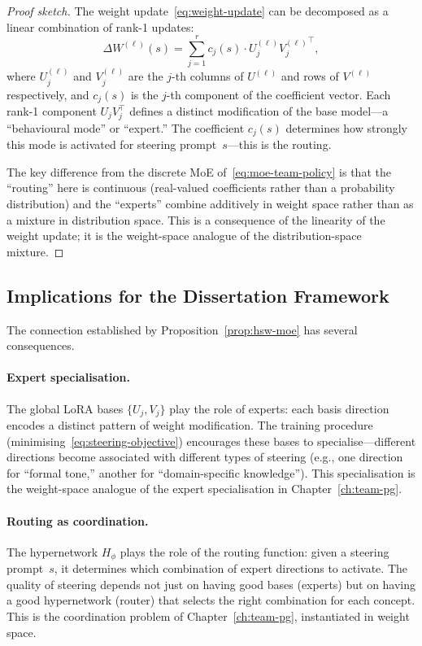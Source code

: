 \begin{proof}[Proof sketch]
The weight update~\eqref{eq:weight-update} can be decomposed as a linear combination of rank-1 updates:
\[
  \Delta W^{(\ell)}(s) = \sum_{j=1}^r c_j(s) \cdot U_j^{(\ell)} {V_j^{(\ell)}}^\top,
\]
where $U_j^{(\ell)}$ and $V_j^{(\ell)}$ are the $j$-th columns of $U^{(\ell)}$ and rows of $V^{(\ell)}$ respectively, and $c_j(s)$ is the $j$-th component of the coefficient vector. Each rank-1 component $U_j V_j^\top$ defines a distinct modification of the base model---a ``behavioural mode'' or ``expert.'' The coefficient $c_j(s)$ determines how strongly this mode is activated for steering prompt~$s$---this is the routing.

The key difference from the discrete MoE of~\eqref{eq:moe-team-policy} is that the ``routing'' here is continuous (real-valued coefficients rather than a probability distribution) and the ``experts'' combine additively in weight space rather than as a mixture in distribution space. This is a consequence of the linearity of the weight update; it is the weight-space analogue of the distribution-space mixture.
\end{proof}

\subsection{Implications for the Dissertation Framework}
\label{subsec:framework-implications}

The connection established by Proposition~\ref{prop:hsw-moe} has several consequences.

\paragraph{Expert specialisation.} The global LoRA bases $\{U_j, V_j\}$ play the role of experts: each basis direction encodes a distinct pattern of weight modification. The training procedure (minimising~\eqref{eq:steering-objective}) encourages these bases to specialise---different directions become associated with different types of steering (e.g., one direction for ``formal tone,'' another for ``domain-specific knowledge''). This specialisation is the weight-space analogue of the expert specialisation in Chapter~\ref{ch:team-pg}.

\paragraph{Routing as coordination.} The hypernetwork $H_\phi$ plays the role of the routing function: given a steering prompt~$s$, it determines which combination of expert directions to activate. The quality of steering depends not just on having good bases (experts) but on having a good hypernetwork (router) that selects the right combination for each concept. This is the coordination problem of Chapter~\ref{ch:team-pg}, instantiated in weight space.

